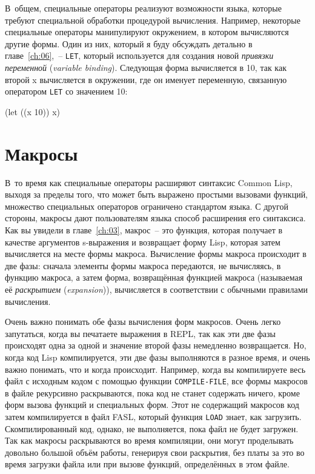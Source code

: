 В~общем, специальные операторы реализуют возможности языка, которые требуют специальной
обработки процедурой вычисления. Например, некоторые специальные операторы манипулируют
окружением, в котором вычисляются другие формы. Один из них, который я буду обсуждать детально в
главе~\ref{ch:06},~-- \lstinline{LET}, который используется для создания новой \textit{привязки
  переменной} (\textit{variable binding}). Следующая форма вычисляется в 10, так как
второй x вычисляется в окружении, где он именует переменную, связанную оператором
\lstinline{LET} со значением 10:

\begin{myverb}
(let ((x 10)) x)
\end{myverb}

\section{Макросы}

В~то время как специальные операторы расширяют синтаксис Common Lisp, выходя за пределы
того, что может быть выражено простыми вызовами функций, множество специальных операторов
ограничено стандартом языка. С другой стороны, макросы дают пользователям языка способ
расширения его синтаксиса. Как вы увидели в главе~\ref{ch:03}, макрос~-- это функция, которая
получает в качестве аргументов s-выражения и возвращает форму Lisp, которая затем
вычисляется на месте формы макроса. Вычисление формы макроса происходит в две фазы:
сначала элементы формы макроса передаются, не вычисляясь, в функцию макроса, а затем
форма, возвращённая функцией макроса (называемая её \textit{раскрытием}
(\textit{expansion})), вычисляется в соответствии с обычными правилами вычисления.

Очень важно понимать обе фазы вычисления форм макросов. Очень легко запутаться, когда вы
печатаете выражения в REPL, так как эти две фазы происходят одна за одной и значение
второй фазы немедленно возвращается. Но, когда код Lisp компилируется, эти две фазы
выполняются в разное время, и очень важно понимать, что и когда происходит. Например,
когда вы компилируете весь файл с исходным кодом с помощью функции \lstinline{COMPILE-FILE},
все формы макросов в файле рекурсивно раскрываются, пока код не станет содержать ничего,
кроме форм вызова функций и специальных форм. Этот не содержащий макросов код затем
компилируется в файл FASL, который функция \lstinline{LOAD} знает, как
загрузить. Скомпилированный код, однако, не выполняется, пока файл не будет загружен. Так
как макросы раскрываются во время компиляции, они могут проделывать довольно
большой объём работы, генерируя свои раскрытия, без платы за это во время загрузки файла
или при вызове функций, определённых в этом файле.

